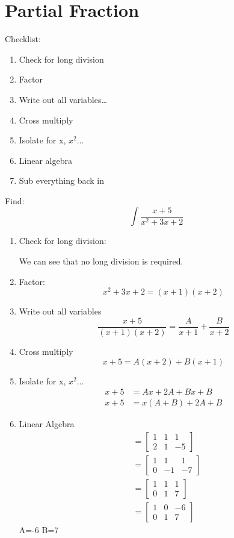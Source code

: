 \section{Partial Fraction}
	Checklist:
	\begin{enumerate}
	\item Check for long division
	\item Factor
	\item Write out all variables\ldots
	\item Cross multiply
	\item Isolate for x, $x^2\ldots$
	\item Linear algebra
	\item Sub everything back in
	\end{enumerate}
	
	\begin{simple}{}{}
	Find:
	$$\int\frac{x+5}{x^2+3x+2}$$
	
	\begin{enumerate}
	\item Check for long division:
	\begin{center}
	We can see that no long division is required.
	\end{center}
	
	\item Factor:
	$$x^2+3x+2=(x+1)(x+2)$$
	
	\item Write out all variables
	$$\frac{x+5}{(x+1)(x+2)}=\frac{A}{x+1}+\frac{B}{x+2}$$
	\item Cross multiply
	$$x+5=A(x+2)+B(x+1)$$
	\item Isolate for x, $x^2\dots$
	\begin{align*}
	x+5&=Ax+2A+Bx+B\\
	x+5&=x(A+B)+2A+B
	\end{align*}
	\item Linear Algebra
	\begin{align*}
	&=\left[\begin{array}{cc|c}
	1 & 1 & 1\\
	2 & 1 & -5
	\end{array}\right]\\
	&=\left[\begin{array}{cc|c}
	1&1&1\\
	0&-1&-7
	\end{array}\right]\\
	&=\left[\begin{array}{cc|c}
	1&1&1\\
	0&1&7
	\end{array}\right]\\
	&=\left[\begin{array}{cc|c}
	1&0&-6\\
	0&1&7
	\end{array}\right]
	\end{align*}
	\noindent A=-6 B=7
	

\end{enumerate}
\end{simple}
